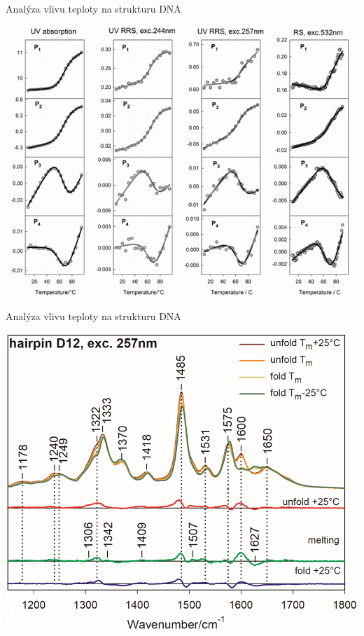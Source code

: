 \documentclass{beamer}
\begin{document}
\begin{frame}{Analýza vlivu teploty na strukturu DNA}
\begin{center}
	\includegraphics[width=.9\columnwidth]{dna_hairpins/pca_hairpin}
\end{center}
\end{frame}

\begin{frame}{Analýza vlivu teploty na strukturu DNA}
\begin{center}
	\includegraphics[width=.9\columnwidth]{dna_hairpins/forms_spectra}
\end{center}
\end{frame}
\end{document}
